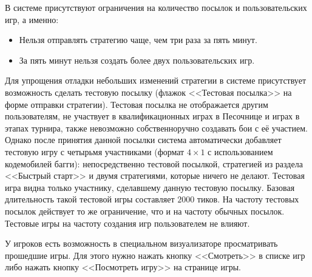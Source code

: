 В системе присутствуют ограничения на количество посылок и пользовательских игр, а именно:
\vspace{-0.15in}
\begin{itemize}
  \item Нельзя отправлять стратегию чаще, чем три раза за пять минут.
\vspace{-0.10in}
  \item За пять минут нельзя создать более двух пользовательских игр.
\vspace{-0.10in}
\end{itemize}

Для упрощения отладки небольших изменений стратегии в системе присутствует возможность сделать тестовую посылку (флажок <<Тестовая посылка>>
на форме отправки стратегии). Тестовая посылка не отображается другим пользователям, не участвует в квалификационных играх в Песочнице и
играх в этапах турнира, также невозможно собственноручно создавать бои с её участием. Однако после принятия данной посылки система
автоматически добавляет тестовую игру с четырьмя участниками (формат $4\times1$ с использованием кодемобилей багги): непосредственно
тестовой посылкой, стратегией из раздела <<Быстрый старт>> и двумя стратегиями, которые ничего не делают. Тестовая игра видна только
участнику, сделавшему данную тестовую посылку. Базовая длительность такой тестовой игры составляет $2000$ тиков. На частоту тестовых посылок
действует то же ограничение, что и на частоту обычных посылок. Тестовые игры на частоту создания игр пользователем не влияют.

У игроков есть возможность в специальном визуализаторе просматривать прошедшие игры. Для этого нужно нажать кнопку <<Смотреть>> в списке игр
либо нажать кнопку <<Посмотреть игру>> на странице игры.

